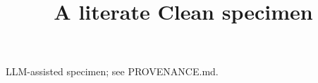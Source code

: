 \documentclass[11pt]{article}
\title{A literate Clean specimen}
\author{}
\date{}
\begin{document}
\maketitle
\noindent LLM-assisted specimen; see PROVENANCE.md.

\end{document}
